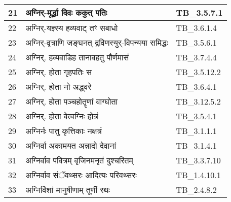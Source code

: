 \documentclass[17pt]{extarticle}
\begin{document}
\begin{longtable}{||p{0.4in}||p{4.9in}||p{0.9in}||}
    21 & अग्निर्{-}मूर्द्धा दिवः ककुत् पतिः & TB\_3.5.7.1       \\
    
    \hline
        
    22 & अग्निर्{-}यज्ञ्स्य हव्यवाट् तꣳ सबाधो & TB\_3.6.1.4       \\
    
    \hline
        
    23 & अग्निर्{-}वृत्राणि जङ्घनत् द्रविणस्युर्{-}विपन्यया समिद्धः & TB\_3.5.6.1       \\
    
    \hline
        
    24 & अग्निर्. हव्यवाडिह तानावहतु पौर्णमासं & TB\_3.7.4.4       \\
    
    \hline
        
    25 & अग्निर्. होता गृहपतिः स & TB\_3.5.12.2       \\
    
    \hline
        
    26 & अग्निर्. होता नो अद्ध्वरे & TB\_3.6.4.1       \\
    
    \hline
        
    27 & अग्निर्. होता पञ्चहोतॄणां वाग्घोता & TB\_3.12.5.2       \\
    
    \hline
        
    28 & अग्निर्. होता वेत्वग्निः होत्रं & TB\_3.5.4.1       \\
    
    \hline
        
    29 & अग्निर्नः पातु कृत्तिकाः नक्षत्रं & TB\_3.1.1.1       \\
    
    \hline
        
    30 & अग्निर्वा अकामयत अन्नादो देवानां & TB\_3.1.4.1       \\
    
    \hline
        
    31 & अग्निर्वाव पवित्रम् वृजिनमनृतं दुश्चरितम् & TB\_3.3.7.10       \\
    
    \hline
        
    32 & अग्निर्वाव संॅवथ्सरः आदित्यः परिवथ्सरः & TB\_1.4.10.1       \\
    
    \hline
        
    33 & अग्निर्विशां मानुषीणाम् तूर्णी रथः & TB\_2.4.8.2       \\
    

\end{longtable}
\end{document}
